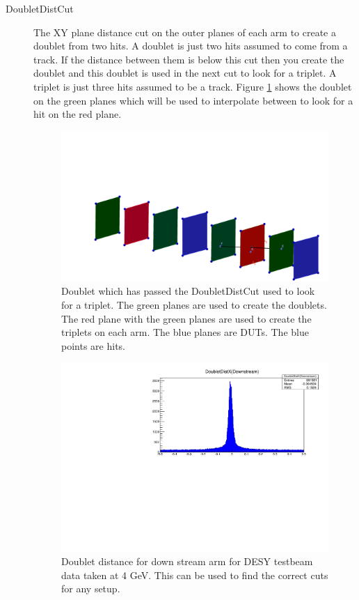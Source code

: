 \begin{description} 
\item[DoubletDistCut]  The XY plane distance cut on the outer planes of each arm to create a doublet from two hits. A doublet  is just two hits assumed to come from a track. If the distance between them is below this cut then you create the doublet and this doublet is used in the next cut to look for a triplet. A triplet is just three hits assumed to be a track. Figure \ref{fig:TripForm} shows the doublet on the green planes which will be used to interpolate between to look for a hit on the red plane. 
\begin{figure}[H]
\centering
\includegraphics[width=1.0\linewidth]{figures/tripletDoubletFormed.png}
\caption{Doublet which has passed the DoubletDistCut used to look for a triplet. The green planes are used to create the doublets. The red plane with the green planes are used to create the triplets on each arm. The blue planes are DUTs. The blue points are hits.}
\label{fig:TripForm}
\end{figure}

\begin{figure}[H]
\centering
\includegraphics[width=1.0\linewidth]{figures/DoubletDistX-442-preOnly.pdf}
\caption{Doublet distance for down stream arm for DESY testbeam data taken at 4 GeV. This can be used to find the correct cuts for any setup.}
\label{fig:DoubDis}
\end{figure}


\end{description}
